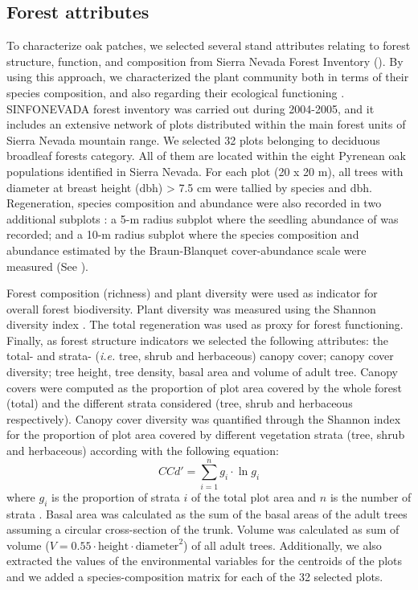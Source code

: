\subsection{Forest attributes}\label{sec:multivar:ForAtri}
To characterize oak patches, we selected several stand attributes relating to forest structure, function, and composition from Sierra Nevada Forest Inventory \autocite[SINFONEVADA,][]{PerezLuqueetal2014SinfonevadaDataset} (). By using this approach, we characterized the plant community both in terms of their species composition, and also regarding their ecological functioning \autocite{McElhinnyetal2005ForestWoodland,delRioetal2016CharacterizationStructure}. SINFONEVADA forest inventory was carried out during 2004-2005, and it includes an extensive network of plots distributed within the main forest units of Sierra Nevada mountain range. We selected 32 plots belonging to deciduous broadleaf forests category. All of them are located within the eight Pyrenean oak populations identified in Sierra Nevada. For each plot (20 x 20 m), all trees with diameter at breast height (dbh) \textgreater{} 7.5 cm were tallied by species and dbh. Regeneration, species composition and abundance were also recorded in two additional subplots \autocite[see][ for a detailed description]{PerezLuqueetal2014SinfonevadaDataset}: a 5-m radius subplot where the seedling abundance of \Qp was recorded; and a 10-m radius subplot where the species composition and abundance estimated by the Braun-Blanquet cover-abundance scale were measured \autocite{BraunBlanquet1964PflanzensoziologieGrundzuge} (See ).

Forest composition (richness) and plant diversity were used as indicator for overall forest biodiversity. Plant diversity was measured using the Shannon diversity index \autocite{Krebs1999EcologicalMethodology}. The total regeneration was used as proxy for forest functioning. Finally, as forest structure indicators we selected the following attributes: the total- and strata- (\emph{i.e.} tree, shrub and herbaceous) canopy cover; canopy cover diversity; tree height, tree density, basal area and volume of adult tree. Canopy covers were computed as the proportion of plot area covered by the whole forest (total) and the different strata considered (tree, shrub and herbaceous respectively). Canopy cover diversity was quantified through the Shannon index for the proportion of plot area covered by different vegetation strata (tree, shrub and herbaceous) according with the following equation: \[CCd'=\sum_{i=1}^{n} g_i \cdot \ln g_i\] where \(g_i\) is the proportion of strata \(i\) of the total plot area and \(n\) is the number of strata \autocite{delRioetal2003IndicesStand}. Basal area was calculated as the sum of the basal areas of the adult trees assuming a circular cross-section of the trunk. Volume was calculated as sum of volume (\(V = 0.55 \cdot \textrm{height} \cdot \textrm{diameter}^2\)) of all \Qp adult trees. Additionally, we also extracted the values of the environmental variables for the centroids of the plots and we added a species-composition matrix for each of the 32 selected plots.

